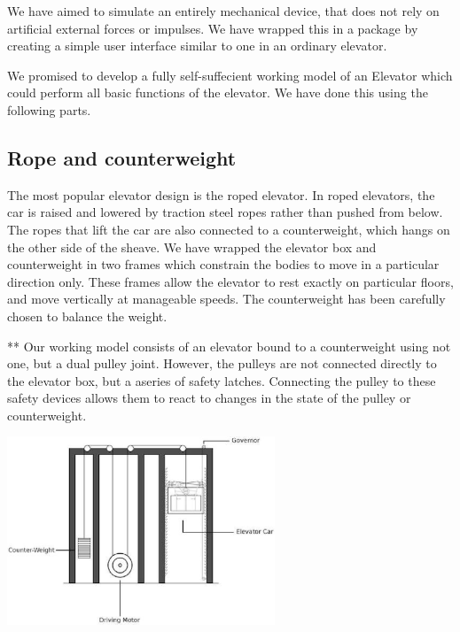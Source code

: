 \documentclass[a4paper,11pt]{article}
\begin{document}
We have aimed to simulate an entirely mechanical device, that does not rely on artificial external forces or impulses. We have wrapped this in a package by creating a simple user interface similar to one in an ordinary elevator. 

We promised to develop a fully self-suffecient working model of an Elevator which could perform all basic functions of the elevator. We have done this using the following parts.

\subsection{Rope and counterweight}

The most popular elevator design is the roped elevator. In roped elevators, the car is raised and lowered by traction steel ropes rather than pushed from below. The ropes that lift the car are also connected to a counterweight, which hangs on the other side of the sheave. 
We have wrapped the elevator box and counterweight in two frames which constrain the bodies to move in a particular direction only.
These frames allow the elevator to rest exactly on particular floors, and move vertically at manageable speeds. The counterweight has been carefully chosen to balance the weight.

** Our working model consists of an elevator bound to a counterweight using not one, but a dual pulley joint. However, the pulleys are not connected directly to the elevator box, but a aseries of safety latches. Connecting the pulley to these safety devices allows them to react to changes in the state of the pulley or counterweight.


\begin{center}
\includegraphics[width=0.6\textwidth]{images/elevatorOrig.eps} 
\end{center}
\end{document}
